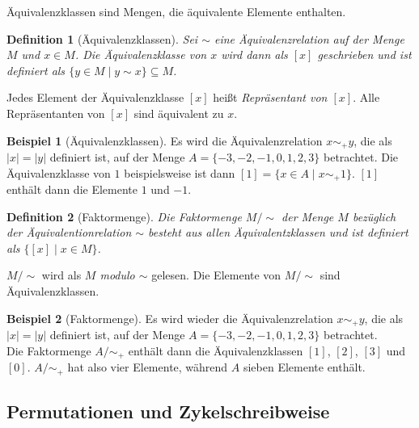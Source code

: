 \documentclass[12pt,a4paper, usenames, dvipsnames]{article}
\theoremstyle{mystyle}
\newtheorem{definition}{Definition}
\theoremstyle{definition}
\newtheorem{bsp}{Beispiel}[definition]
\begin{document}
Äquivalenzklassen sind Mengen, die äquivalente Elemente enthalten.

\begin{definition}[Äquivalenzklassen]

Sei $ \sim $ eine Äquivalenzrelation auf der Menge $M$ und $x \in M$. Die Äquivalenzklasse von $x$ wird dann als $[x]$ geschrieben und ist definiert als $\{y \in M \mid y \sim x\} \subseteq M$.  

\end{definition}

Jedes Element der Äquivalenzklasse $[x]$ heißt \textit{Repräsentant von $[x]$}. Alle Repräsentanten von $[x]$ sind äquivalent zu $x$.

\begin{bsp}[Äquivalenzklassen]
Es wird die Äquivalenzrelation $x \sim_+ y$, die als $|x| =|y|$ definiert ist, auf der Menge $A=\{ -3, -2, -1, 0, 1, 2, 3 \}$ betrachtet. Die Äquivalenzklasse von $1$ beispielsweise ist dann $[1] = \{x \in A \mid x \sim_+ 1\}$. $[1]$ enthält dann die Elemente $1$ und $-1$.

\end{bsp}

\begin{definition}[Faktormenge]

Die Faktormenge $M / \sim $ der Menge $M$ bezüglich der Äquivalentionrelation $\sim$ besteht aus allen Äquivalentzklassen und ist definiert als $\{ [x] \mid x \in M \}$.

\end{definition}

$M / \sim $ wird als \textit{$M$ modulo $\sim$} gelesen. Die Elemente von $M / \sim $ sind Äquivalenzklassen.

\begin{bsp}[Faktormenge]

Es wird wieder die Äquivalenzrelation $x \sim_+ y$, die als $|x| =|y|$ definiert ist, auf der Menge $A=\{ -3, -2, -1, 0, 1, 2, 3 \}$ betrachtet.  \\
Die Faktormenge $A / \sim_+$ enthält dann die Äquivalenzklassen $[1]$, $[2]$, $[3]$ und $[0]$. $A / \sim_+$ hat also vier Elemente, während $A$ sieben Elemente enthält.

\end{bsp}



%
%
%
%
%
%
%
%
%
%
%
%
%
\subsection{Permutationen und Zykelschreibweise} 
 \label{Abschnitt_PermutationZykel}
\end{document}
